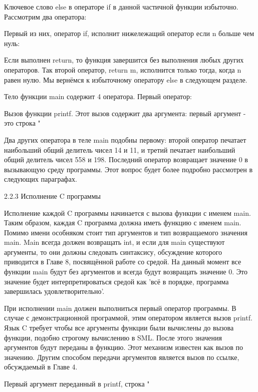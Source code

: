 Ключевое слово else в операторе if в данной частичной функции избыточно. Рассмотрим два оператора:

Первый из них, оператор if, исполнит нижележащий оператор если n больше чем нуль:

Если выполнен return, то функция завершится без выполнения любых других операторов. Так второй оператор, return m, исполнится только тогда, когда n равен нулю. Мы вернёмся к избыточному оператору else в следующем разделе.

Тело функции main содержит 4 оператора. Первый оператор:

Вызов функции printf. Этот вызов содержит два аргумента: первый аргумент - это строка "%

Два других оператора в теле main подобны первому: второй оператор печатает наибольший общий делитель чисел 14 и 11, и третий печатает наибольший общий делитель чисел 558 и 198. Последний оператор возвращает значение 0 в вызывающую среду программы. Этот вопрос будет более подробно рассмотрен в следующих параграфах.

2.2.3 Исполнение C программы

Исполнение каждой C программы начинается с вызова функции с именем main. Таким образом, каждая C программа должна иметь функцию с именем main. Помимо имени особняком стоит тип аргументов и тип возвращаемого значения main. Main всегда должен возвращать int, и если для main существуют аргументы, то они должны следовать синтаксису, обсуждение которого приводится в Главе 8, посвящённой работе со средой. На данный момент все функции main будут без аргументов и всегда будут возвращать значение 0. Это значение будет интерпретироваться средой как 'всё в порядке, программа завершилась удовлетворительно'.

При исполнении main должен выполниться первый оператор программы. В случае с демонстрационной программой, этим оператором является вызов printf. Язык C требует чтобы все аргументы функции были вычислены до вызова функции, подобно строгому вычислению в SML. После этого значения аргументов будут переданы в функцию. Этот механизм известен как вызов по значению. Другим способом передачи аргументов является вызов по ссылке, обсуждаемый в Главе 4.

Первый аргумент переданный в printf, строка "%

